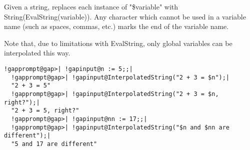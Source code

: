 \documentclass[a4paper,11pt]{report}
\begin{document}
{{{ Given a string, replaces each instance of "\$variable" with
String(EvalString(variable)). Any character which cannot be used in a variable
name (such as spaces, commas, etc.) marks the end of the variable name. 

 Note that, due to limitations with EvalString, only global variables can be
interpolated this way. }

 
\begin{Verbatim}[commandchars=!@|,fontsize=\small,frame=single,label=Example]
  !gapprompt@gap>| !gapinput@n := 5;;|
  !gapprompt@gap>| !gapinput@InterpolatedString("2 + 3 = $n");|
  "2 + 3 = 5"
  !gapprompt@gap>| !gapinput@InterpolatedString("2 + 3 = $n, right?");|
  "2 + 3 = 5, right?"
  !gapprompt@gap>| !gapinput@nn := 17;;|
  !gapprompt@gap>| !gapinput@InterpolatedString("$n and $nn are different");|
  "5 and 17 are different"
\end{Verbatim}
 }

 }

   
\end{document}
